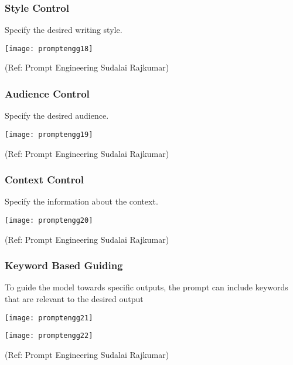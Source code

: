 \begin{frame}[fragile]\frametitle{Style Control}

Specify the desired writing style.

\begin{center}
\texttt{[image: promptengg18]}

{\tiny (Ref: Prompt Engineering Sudalai Rajkumar)}

\end{center}		
		
		


\end{frame}

\begin{frame}[fragile]\frametitle{Audience Control}

Specify the desired audience.

\begin{center}
\texttt{[image: promptengg19]}

{\tiny (Ref: Prompt Engineering Sudalai Rajkumar)}

\end{center}		


\end{frame}

\begin{frame}[fragile]\frametitle{Context Control}

Specify the information about the context.

\begin{center}
\texttt{[image: promptengg20]}

{\tiny (Ref: Prompt Engineering Sudalai Rajkumar)}

\end{center}		
		
		


\end{frame}

\begin{frame}[fragile]\frametitle{ Keyword Based Guiding}

To guide the model towards specific outputs, the prompt can include 
keywords that are relevant to the desired output

\begin{center}
\texttt{[image: promptengg21]}

\texttt{[image: promptengg22]}

{\tiny (Ref: Prompt Engineering Sudalai Rajkumar)}

\end{center}		
		
		
		


\end{frame}

